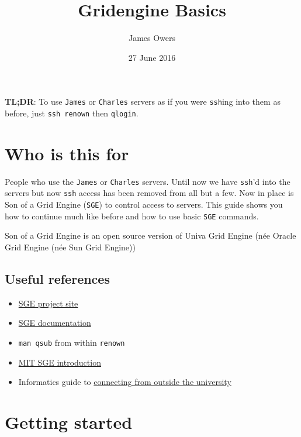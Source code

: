 \documentclass[]{article}
\title{Gridengine Basics}
\author{James Owers}
\date{27 June 2016}
\begin{document}
\maketitle


{
\hypersetup{linkcolor=black}
\setcounter{tocdepth}{2}
\tableofcontents
}
\textbf{TL;DR}: To use \texttt{James} or \texttt{Charles} servers as if
you were \texttt{ssh}ing into them as before, just \texttt{ssh renown}
then \texttt{qlogin}.

\section{Who is this for}\label{who-is-this-for}

People who use the \texttt{James} or \texttt{Charles} servers. Until now
we have \texttt{ssh}'d into the servers but now \texttt{ssh} access has
been removed from all but a few. Now in place is Son of a Grid Engine
(\texttt{SGE}) to control access to servers. This guide shows you how to
continue much like before and how to use basic \texttt{SGE} commands.

Son of a Grid Engine is an open source version of Univa Grid Engine (née
Oracle Grid Engine (née Sun Grid Engine))

\subsection{Useful references}\label{useful-references}

\begin{itemize}
\itemsep1pt\parskip0pt
\item
  \href{https://arc.liv.ac.uk/trac/SGE}{SGE project site}
\item
  \href{http://arc.liv.ac.uk/SGE/htmlman/manuals.html}{SGE
  documentation}
\item
  \texttt{man qsub} from within \texttt{renown}
\item
  \href{http://star.mit.edu/cluster/docs/0.92rc2/guides/sge.html}{MIT
  SGE introduction}
\item
  Informatics guide to
  \href{http://computing.help.inf.ed.ac.uk/connecting-home-overview}{connecting
  from outside the university}
\end{itemize}

\section{Getting started}\label{getting-started}
\end{document}
